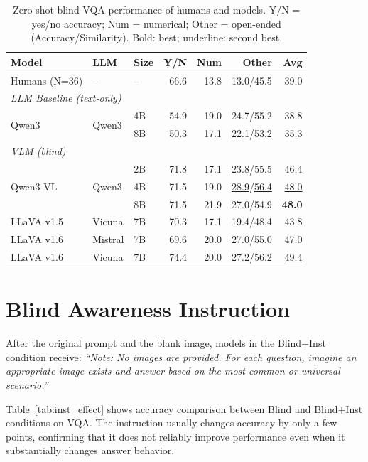 \documentclass[letterpaper]{article}
\begin{document}
\begin{table}[h]
\centering
\caption{Zero-shot blind VQA performance of humans and models.
Y/N = yes/no accuracy; Num = numerical; Other = open-ended (Accuracy/Similarity).
Bold: best; underline: second best.}
\label{tab:main}
\small
\begin{tabular}{lll rrrr}
\toprule
\textbf{Model} & \textbf{LLM} & \textbf{Size} & Y/N & Num & Other & Avg \\
\midrule
Humans (N=36) & -- & -- & 66.6 & 13.8 & 13.0/45.5 & 39.0 \\
\midrule
\multicolumn{7}{l}{\textit{LLM Baseline (text-only)}} \\
\multirow{2}{*}{Qwen3} & \multirow{2}{*}{Qwen3} & 4B
    & 54.9 & 19.0 & 24.7/55.2 & 38.8 \\
 & & 8B & 50.3 & 17.1 & 22.1/53.2 & 35.3 \\
\midrule
\multicolumn{7}{l}{\textit{VLM (blind)}} \\
\multirow{3}{*}{Qwen3-VL} & \multirow{3}{*}{Qwen3} & 2B
    & 71.8 & 17.1 & 23.8/55.5 & 46.4 \\
 & & 4B & 71.5 & 19.0 & \underline{28.9}/\underline{56.4} & \underline{48.0} \\
 & & 8B & 71.5 & 21.9 & 27.0/54.9 & \textbf{48.0} \\
\midrule
LLaVA v1.5 & Vicuna & 7B & 70.3 & 17.1 & 19.4/48.4 & 43.8 \\
LLaVA v1.6 & Mistral & 7B & 69.6 & 20.0 & 27.0/55.0 & 47.0 \\
LLaVA v1.6 & Vicuna & 7B & 74.4 & 20.0 & 27.2/56.2 & \underline{49.4} \\
\bottomrule
\end{tabular}
\end{table}

\section{Blind Awareness Instruction}
\label{app:inst}

After the original prompt and the blank image, models in the Blind+Inst
condition receive: \textit{``Note: No images are provided. For each question,
imagine an appropriate image exists and answer based on the most common or
universal scenario.''}

Table~\ref{tab:inst_effect} shows accuracy comparison between Blind and
Blind+Inst conditions on VQA. The instruction usually changes accuracy by only
a few points, confirming that it does not reliably improve performance even when
it substantially changes answer behavior.
\end{document}
